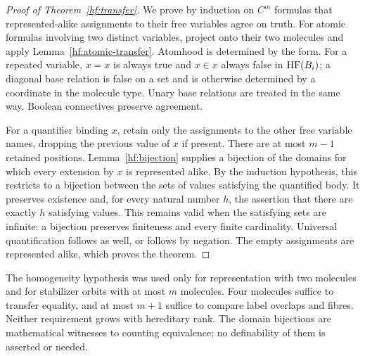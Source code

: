 \begin{proof}[Proof of Theorem~\ref{hf:transfer}]
We prove by induction on $C^m$ formulas that represented-alike
assignments to their free variables agree on truth.
For atomic formulas involving two distinct variables, project onto
their two molecules and apply Lemma~\ref{hf:atomic-transfer}.
Atomhood is determined by the form.
For a repeated variable, $x=x$ is always true and $x\in x$ always
false in $\operatorname{HF}(B_i)$; a diagonal base relation is false on a set and is
otherwise determined by a coordinate in the molecule type.
Unary base relations are treated in the same way.
Boolean connectives preserve agreement.

For a quantifier binding $x$, retain only the assignments to the other
free variable names, dropping the previous value of $x$ if present.
There are at most $m-1$ retained positions.
Lemma~\ref{hf:bijection} supplies a bijection of the domains for which
every extension by $x$ is represented alike.
By the induction hypothesis, this restricts to a bijection between the
sets of values satisfying the quantified body.
It preserves existence and, for every natural number $h$, the assertion
that there are exactly $h$ satisfying values.
This remains valid when the satisfying sets are infinite: a bijection
preserves finiteness and every finite cardinality.
Universal quantification follows as well, or follows by negation.
The empty assignments are represented alike, which proves the theorem.
\end{proof}

The homogeneity hypothesis was used only for representation with two
molecules and for stabilizer orbits with at most $m$ molecules.
Four molecules suffice to transfer equality, and at most $m+1$
suffice to compare label overlaps and fibres.
Neither requirement grows with hereditary rank.
The domain bijections are mathematical witnesses to counting
equivalence; no definability of them is asserted or needed.
